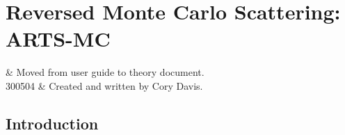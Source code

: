 \graphicspath{{Figs/montecarlo/}}

%
%
\chapter{Reversed Monte Carlo Scattering: ARTS-MC}


%
%
 & Moved from user guide to theory document.\\
  300504 & Created and written by Cory Davis.\\
\stophistory


%
%
%

%
%




\section{Introduction}

